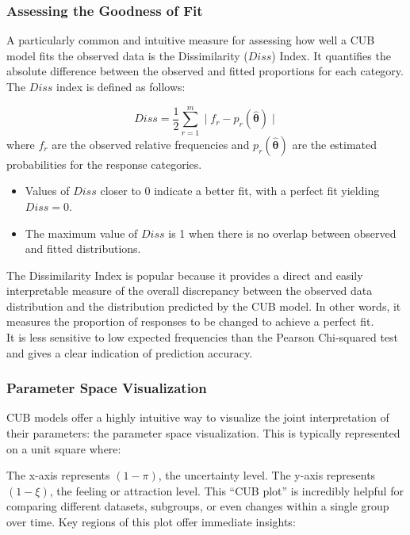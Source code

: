 \documentclass[
  letterpaper,
  DIV=11,
  numbers=noendperiod]{scrartcl}
\providecommand{\tightlist}{%
  \setlength{\itemsep}{0pt}\setlength{\parskip}{0pt}}\usepackage{longtable,booktabs,array}
\begin{document}
\hypertarget{assessing-the-goodness-of-fit}{%
\subsubsection{Assessing the Goodness of
Fit}\label{assessing-the-goodness-of-fit}}

A particularly common and intuitive measure for assessing how well a CUB
model fits the observed data is the Dissimilarity (\(Diss\)) Index. It
quantifies the absolute difference between the observed and fitted
proportions for each category. The \(Diss\) index is defined as follows:

\[
Diss = \frac{1}{2}\sum_{r = 1}^{m} \mid f_r - p_r(\hat{\boldsymbol{\theta}})\mid
\] where \(f_r\) are the observed relative frequencies and
\(p_r(\hat{\boldsymbol{\theta}})\) are the estimated probabilities for
the response categories.

\begin{itemize}
\tightlist
\item
  Values of \(Diss\) closer to 0 indicate a better fit, with a perfect
  fit yielding \(Diss = 0\).
\item
  The maximum value of \(Diss\) is 1 when there is no overlap between
  observed and fitted distributions.
\end{itemize}

The Dissimilarity Index is popular because it provides a direct and
easily interpretable measure of the overall discrepancy between the
observed data distribution and the distribution predicted by the CUB
model. In other words, it measures the proportion of responses to be
changed to achieve a perfect fit.\\
It is less sensitive to low expected frequencies than the Pearson
Chi-squared test and gives a clear indication of prediction accuracy.

\hypertarget{parameter-space-visualization}{%
\subsubsection{Parameter Space
Visualization}\label{parameter-space-visualization}}

CUB models offer a highly intuitive way to visualize the joint
interpretation of their parameters: the parameter space visualization.
This is typically represented on a unit square where:

The x-axis represents \((1−\pi)\), the uncertainty level. The y-axis
represents \((1−\xi)\), the feeling or attraction level. This ``CUB
plot'' is incredibly helpful for comparing different datasets,
subgroups, or even changes within a single group over time. Key regions
of this plot offer immediate insights:
\end{document}
